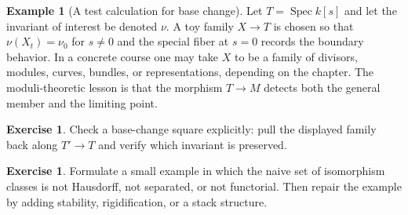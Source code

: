 \documentclass[11pt]{amsart}
\theoremstyle{definition}
\newtheorem{example}[theorem]{Example}
\newtheorem{exercise}[theorem]{Exercise}
\newcommand{\Spec}{\operatorname{Spec}}
\begin{document}
\begin{example}[A test calculation for base change]
Let $T=\Spec k[s]$ and let the invariant of interest be denoted $\nu$.  A toy family $X\to T$ is chosen so that $\nu(X_t)=\nu_0$ for $s\ne0$ and the special fiber at $s=0$ records the boundary behavior.  In a concrete course one may take $X$ to be a family of divisors, modules, curves, bundles, or representations, depending on the chapter.  The moduli-theoretic lesson is that the morphism $T\to M$ detects both the general member and the limiting point.
\end{example}
\begin{exercise}
Check a base-change square explicitly: pull the displayed family back along $T\prime\to T$ and verify which invariant is preserved.
\end{exercise}
\begin{exercise}
Formulate a small example in which the naive set of isomorphism classes is not Hausdorff, not separated, or not functorial.  Then repair the example by adding stability, rigidification, or a stack structure.
\end{exercise}
\clearpage
\end{document}
